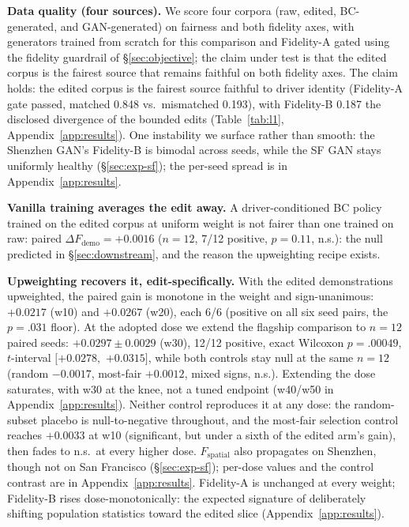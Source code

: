 \textbf{Data quality (four sources).} We score four corpora (raw, edited,
BC-generated, and GAN-generated) on fairness and both fidelity axes, with
generators trained from scratch for this comparison and Fidelity-A gated using
the fidelity guardrail of \S\ref{sec:objective}; the claim under test is
that the edited corpus is the fairest source that remains faithful on both
fidelity axes. The claim holds: the edited corpus is the fairest source
faithful to driver identity (Fidelity-A gate passed, matched 0.848 vs.\ mismatched
0.193), with Fidelity-B 0.187 the disclosed divergence of the bounded edits
(Table~\ref{tab:l1}, Appendix~\ref{app:results}). One instability we surface
rather than smooth: the Shenzhen GAN's Fidelity-B is bimodal across seeds, 
while the SF GAN stays uniformly healthy (\S\ref{sec:exp-sf}); the
per-seed spread is in Appendix~\ref{app:results}.

\textbf{Vanilla training averages the edit away.} A driver-conditioned BC
policy trained on the edited corpus at uniform weight is not fairer than one
trained on raw: paired $\Delta F_{\mathrm{demo}} = +0.0016$ ($n = 12$,
7/12 positive, $p = 0.11$, n.s.): the null predicted in
\S\ref{sec:downstream}, and the reason the upweighting recipe exists.

\textbf{Upweighting recovers it, edit-specifically.} With the edited
demonstrations upweighted, the paired gain is monotone in the weight and
sign-unanimous: $+0.0217$ (w10) and $+0.0267$ (w20), each 6/6
(positive on all six seed pairs, the $p = .031$ floor). At the adopted dose we extend the flagship comparison to
$n = 12$ paired seeds: $+0.0297 \pm 0.0029$ (w30), 12/12 positive, exact
Wilcoxon $p = .00049$, $t$-interval $[+0.0278,$ $+0.0315]$, while both %
controls stay null at the same $n = 12$ (random $-0.0017$, most-fair
$+0.0012$, mixed signs, n.s.).
Extending the dose saturates, with w30 at the knee, not a tuned endpoint
(w40/w50 in Appendix~\ref{app:results}). Neither
control reproduces it at any dose: the random-subset placebo is
null-to-negative throughout, and the most-fair selection control reaches
$+0.0033$ at w10 (significant, but under a sixth of the edited arm's
gain), then fades to n.s.\ at every higher dose. $F_{\mathrm{spatial}}$ also propagates
on Shenzhen, though not on San Francisco (\S\ref{sec:exp-sf}); per-dose
values and the control contrast are in Appendix~\ref{app:results}. Fidelity-A is unchanged at every weight;
Fidelity-B rises dose-monotonically: the expected signature of deliberately
shifting population statistics toward the edited slice (Appendix~\ref{app:results}).


